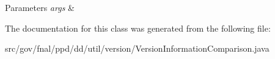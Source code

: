 \begin{DoxyParams}{Parameters}
{\em args} & \\
\hline
\end{DoxyParams}


The documentation for this class was generated from the following file\-:\begin{DoxyCompactItemize}
\item 
src/gov/fnal/ppd/dd/util/version/Version\-Information\-Comparison.\-java\end{DoxyCompactItemize}
